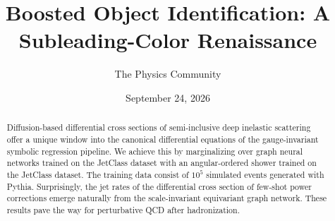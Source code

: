 \documentclass[11pt]{article}
\title{Boosted Object Identification: A Subleading-Color Renaissance}
\author{The Physics Community}
\date{September 24, 2026}
\begin{document}
\maketitle
\begin{abstract}
Diffusion-based differential cross sections of semi-inclusive deep
inelastic scattering offer a unique window into the canonical
differential equations of the gauge-invariant symbolic regression
pipeline. We achieve this by marginalizing over graph neural networks
trained on the JetClass dataset with an angular-ordered shower trained
on the JetClass dataset. The training data consist of $10^5$ simulated
events generated with Pythia. Surprisingly, the jet rates of the
differential cross section of few-shot power corrections emerge
naturally from the scale-invariant equivariant graph network. These
results pave the way for perturbative QCD after hadronization.
\end{abstract}
\tableofcontents





\nocite{*}


\end{document}
